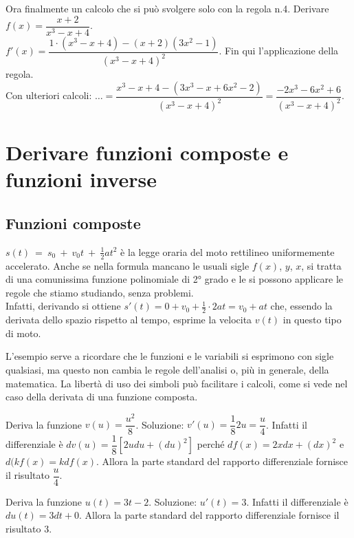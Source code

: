 \begin{esempio}
 Ora finalmente un calcolo che si può svolgere solo con la regola n.4.
 Derivare $f(x)= \dfrac{x+2}{x^3-x+4}$.\\
 $f'(x)=\dfrac{1\cdot(x^3-x+4)-(x+2)(3x^2-1)}{(x^3-x+4)^2}$. Fin qui 
 l'applicazione della regola. \\
 Con ulteriori calcoli:
 $\dots =\dfrac{x^3-x+4-(3x^3-x+6x^2-2)}{(x^3-x+4)^2}=
 \dfrac{-2x^3-6x^2+6}{(x^3-x+4)^2}$.\\
\end{esempio}


\section{Derivare funzioni composte e funzioni inverse}
\label{}
\subsection{Funzioni composte}
\label{subsec:diff01_dericomp}

\begin{esempio}
 $s(t)~=~s_0~+~v_0t~+~\frac{1}{2}at^2$ è la legge oraria del moto rettilineo
 uniformemente accelerato. Anche se nella formula mancano le usuali 
 sigle $f(x)$, $y$, $x$, si tratta di una comunissima funzione polinomiale
 di 2° grado e le si possono applicare le regole che stiamo studiando, senza
 problemi.\\
 Infatti, derivando si ottiene $s'(t)=0+v_0+\frac{1}{2}\cdot 2at=v_0+at$ 
che,
 essendo la derivata dello spazio rispetto al tempo, esprime la velocita 
$v(t)$
 in questo tipo di moto.
\end{esempio}
L'esempio serve a ricordare che le funzioni e le variabili si esprimono con 
sigle qualsiasi, ma questo non cambia le regole dell'analisi o, più in
generale, della matematica. La libertà di uso dei simboli può facilitare i
calcoli, come si vede nel caso della derivata di una funzione composta.
\begin{esempio}
  Deriva la funzione $v(u)=\dfrac{u^2}{8}$. 
  Soluzione: $v'(u)=\dfrac{1}{8}2u=\dfrac{u}{4}$. Infatti il 
  differenziale è $dv(u)=\dfrac{1}{8}[2udu+(du)^2]$ perché 
$df(x)=2xdx+(dx)^2$ 
  e $d(kf(x)=kdf(x)$. Allora  la parte 
 standard del rapporto differenziale fornisce il risultato $\dfrac{u}{4}$.
\end{esempio}

\begin{esempio}
Deriva la funzione $u(t)=3t-2$. Soluzione: $u'(t)=3$. Infatti il 
 differenziale è $du(t)=3dt+ 0$. Allora la parte 
 standard del rapporto differenziale fornisce il risultato $3$.
\end{esempio}

